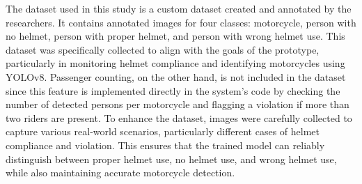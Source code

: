 \begin{refsection}
The dataset used in this study is a custom dataset created and annotated by the researchers. It contains annotated images for four classes: motorcycle, person with no helmet, person with proper helmet, and person with wrong helmet use. This dataset was specifically collected to align with the goals of the prototype, particularly in monitoring helmet compliance and identifying motorcycles using YOLOv8. Passenger counting, on the other hand, is not included in the dataset since this feature is implemented directly in the system’s code by checking the number of detected persons per motorcycle and flagging a violation if more than two riders are present. To enhance the dataset, images were carefully collected to capture various real-world scenarios, particularly different cases of helmet compliance and violation. This ensures that the trained model can reliably distinguish between proper helmet use, no helmet use, and wrong helmet use, while also maintaining accurate motorcycle detection.

\begin{figure}[H]
    \centering
    

\end{figure}
\end{refsection}
